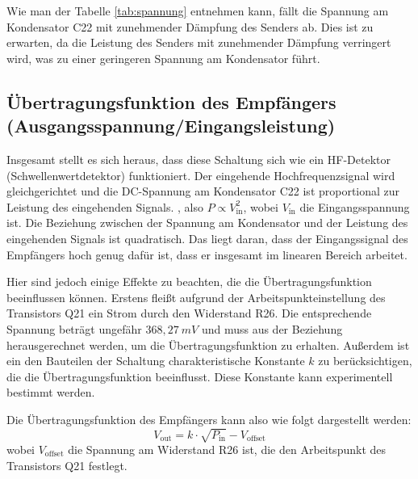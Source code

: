 Wie man der Tabelle \ref{tab:spannung} entnehmen kann, fällt die Spannung am Kondensator C22 mit zunehmender Dämpfung des Senders ab. Dies ist zu erwarten, da die Leistung des Senders mit zunehmender Dämpfung verringert wird, was zu einer geringeren Spannung am Kondensator führt.

\subsection{Übertragungsfunktion des Empfängers (Ausgangsspannung/Eingangsleistung)}
Insgesamt stellt es sich heraus, dass diese Schaltung sich wie ein HF-Detektor (Schwellenwertdetektor) funktioniert. Der eingehende Hochfrequenzsignal wird gleichgerichtet und die DC-Spannung am Kondensator C22 ist proportional zur Leistung des eingehenden Signals. 
, also \( P \propto V_\text{in}^2 \), wobei \( V_\text{in} \) die Eingangsspannung ist. Die Beziehung zwischen der Spannung am Kondensator und der Leistung des eingehenden Signals ist quadratisch. Das liegt daran, dass der Eingangssignal des Empfängers hoch genug dafür ist, dass er insgesamt im linearen Bereich arbeitet. 

Hier sind jedoch einige Effekte zu beachten, die die Übertragungsfunktion beeinflussen können. Erstens fleißt aufgrund der Arbeitspunkteinstellung des Transistors Q21 ein Strom durch den Widerstand R26. Die entsprechende Spannung beträgt ungefähr $368,27~mV$ und muss aus der Beziehung herausgerechnet werden, um die Übertragungsfunktion zu erhalten. Außerdem ist ein den Bauteilen der Schaltung charakteristische Konstante \( k \) zu berücksichtigen, die die Übertragungsfunktion beeinflusst. Diese Konstante kann experimentell bestimmt werden.

Die Übertragungsfunktion des Empfängers kann also wie folgt dargestellt werden:
\begin{equation}
    V_\text{out} = k \cdot \sqrt{P_\text{in}} - V_\text{offset}
\end{equation}
wobei \( V_\text{offset} \) die Spannung am Widerstand R26 ist, die den Arbeitspunkt des Transistors Q21 festlegt. 


